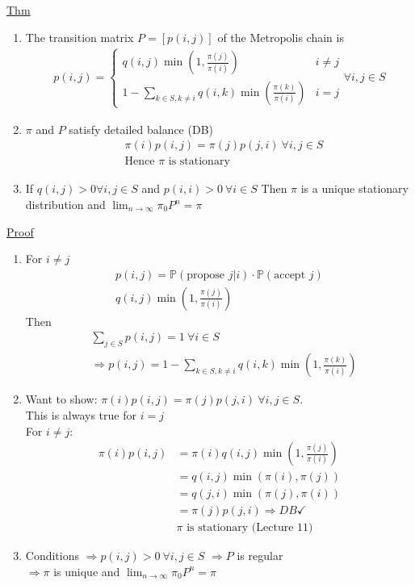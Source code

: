 \documentclass[12pt, letterpaper]{article}
\begin{document}
\noindent \underline{Thm}
\begin{enumerate}
    \item The transition matrix $P = [p(i,j)]$ of the Metropolis chain is 
    \begin{align*}
        p(i,j) = \begin{cases}
            q(i,j) \min(1, \frac{\pi(j)}{\pi(i)}) & i \ne j \\
            1 - \sum_{k\in S, k\ne i} q(i,k) \min(\frac{\pi(k)}{\pi(i)}) & i = j
        \end{cases}
        \forall i,j \in S
    \end{align*}
    \item $\pi$ and $P$ satisfy detailed balance (DB)
    \begin{align*}
        &\pi(i)p(i,j) = \pi(j)p(j,i)\ \forall i,j \in S \\
        &\text{Hence } \pi \text{ is stationary}
    \end{align*}
    \item If $q(i,j) > 0 \forall i,j \in S$ and $p(i,i) > 0\ \forall i \in S$
    Then $\pi$ is a unique stationary distribution and $\lim_{n\rightarrow\infty}
    \pi_0 P^n = \pi$
\end{enumerate}
\underline{Proof}
\begin{enumerate}
    \item For $i \ne j$
    \begin{align*}
        p(i,j) = \mathbb{P}(\text{propose } j|i)\cdot \mathbb{P}(\text{accept } j) \\
        q(i,j) \min(1, \frac{\pi(j)}{\pi(i)})
    \end{align*}
    Then 
    \begin{align*}
        &\sum_{j \in S} p(i,j) = 1\ \forall i \in S \\
        &\Rightarrow p (i,j) = 1 - \sum_{k \in S, k\ne i} q(i,k) \min(1, \frac{\pi(k)}{\pi(i)})
    \end{align*}
    \item Want to show: $\pi(i)p(i,j) = \pi(j)p(j,i)\ \forall i,j \in S$. \\
    This is always true for $i = j$ \\
    For $i \ne j$:
    \begin{align*}
        \pi(i)p(i,j) &= \pi(i) q(i,j) \min(1, \frac{\pi(j)}{\pi(i)}) \\
        &= q(i,j) \min(\pi(i), \pi(j)) \\
        &= q(j,i) \min(\pi(j), \pi(i)) \\
        &= \pi(j) p(j,i) \Rightarrow DB \checkmark \\
        & \pi \text{ is stationary (Lecture 11)}
    \end{align*}
    \item Conditions $\Rightarrow p(i,j) > 0\ \forall i,j \in S$ 
    $\Rightarrow P $ is regular \\
    $\Rightarrow \pi$ is unique and $\lim_{n\rightarrow\infty} \pi_0P^n = \pi$
\end{enumerate}
\end{document}
